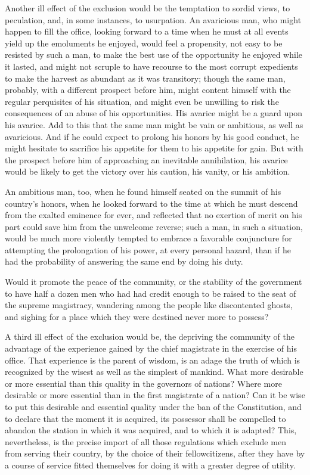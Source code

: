 Another ill effect of the exclusion would be the temptation to sordid views, to peculation, and, in some instances, to usurpation. An avaricious man, who might happen to fill the office, looking forward to a time when he must at all events yield up the emoluments he enjoyed, would feel a propensity, not easy to be resisted by such a man, to make the best use of the opportunity he enjoyed while it lasted, and might not scruple to have recourse to the most corrupt expedients to make the harvest as abundant as it was transitory; though the same man, probably, with a different prospect before him, might content himself with the regular perquisites of his situation, and might even be unwilling to risk the consequences of an abuse of his opportunities. His avarice might be a guard upon his avarice. Add to this that the same man might be vain or ambitious, as well as avaricious. And if he could expect to prolong his honors by his good conduct, he might hesitate to sacrifice his appetite for them to his appetite for gain. But with the prospect before him of approaching an inevitable annihilation, his avarice would be likely to get the victory over his caution, his vanity, or his ambition.

An ambitious man, too, when he found himself seated on the summit of his country's honors, when he looked forward to the time at which he must descend from the exalted eminence for ever, and reflected that no exertion of merit on his part could save him from the unwelcome reverse; such a man, in such a situation, would be much more violently tempted to embrace a favorable conjuncture for attempting the prolongation of his power, at every personal hazard, than if he had the probability of answering the same end by doing his duty.

Would it promote the peace of the community, or the stability of the government to have half a dozen men who had had credit enough to be raised to the seat of the supreme magistracy, wandering among the people like discontented ghosts, and sighing for a place which they were destined never more to possess?

A third ill effect of the exclusion would be, the depriving the community of the advantage of the experience gained by the chief magistrate in the exercise of his office. That experience is the parent of wisdom, is an adage the truth of which is recognized by the wisest as well as the simplest of mankind. What more desirable or more essential than this quality in the governors of nations? Where more desirable or more essential than in the first magistrate of a nation? Can it be wise to put this desirable and essential quality under the ban of the Constitution, and to declare that the moment it is acquired, its possessor shall be compelled to abandon the station in which it was acquired, and to which it is adapted? This, nevertheless, is the precise import of all those regulations which exclude men from serving their country, by the choice of their fellowcitizens, after they have by a course of service fitted themselves for doing it with a greater degree of utility.

